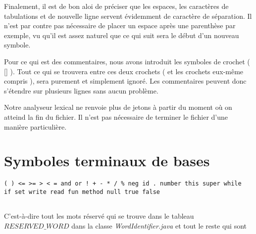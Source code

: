 Finalement, il est de bon aloi de préciser que les espaces, les caractères de tabulations et de nouvelle ligne servent évidemment de caractère de séparation. Il n'est par contre pas nécessaire de placer un espace après une parenthèse par exemple, vu qu'il est assez naturel que ce qui suit sera le début d'un nouveau symbole.

Pour ce qui est des commentaires, nous avons introduit les symboles de crochet ( [] ). Tout ce qui se trouvera entre ces deux crochets ( et les crochets eux-même compris ), sera purement et simplement ignoré. Les commentaires peuvent donc s'étendre sur plusieurs lignes sans aucun problème.

Notre analyseur lexical ne renvoie plus de jetons à partir du moment où on atteind la fin du fichier. Il n'est pas nécessaire de terminer le fichier d'une manière particulière.


\section{Symboles terminaux de bases}
\begin{verbatim}
( ) <= >= > < = and or ! + - * / % neg id . number this super while 
if set write read fun method null true false 
 
\end{verbatim}
C'est-à-dire tout les mots réservé qui se trouve dans le tableau $RESERVED\_WORD$ dans la classe \textit{WordIdentifier.java} et tout le reste qui sont



